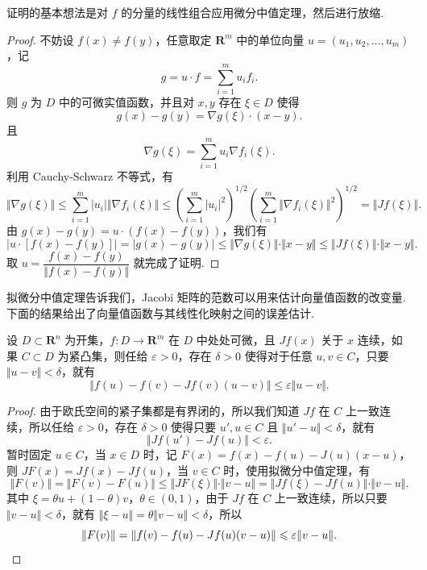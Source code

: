 证明的基本想法是对 $f$ 的分量的线性组合应用微分中值定理，然后进行放缩.

\begin{proof}
    不妨设 $f(x) \neq f(y)$，任意取定 $\mathbf{R}^m$ 中的单位向量 $u = (u_1, u_2, \ldots, u_m)$，记\[g = u\cdot f = \sum_{i = 1}^{m}u_if_i.\]
    则 $g$ 为 $D$ 中的可微实值函数，并且对 $x, y$ 存在 $\xi\in D$ 使得 \[g(x) - g(y) = \nabla g(\xi)\cdot (x - y).\]
    且 \[\nabla g(\xi) = \sum_{i = 1}^{m}u_i\nabla f_i(\xi).\]
    利用 Cauchy-Schwarz 不等式，有 \[\Vert \nabla g(\xi)\Vert \leqslant \sum_{i = 1}^m\vert u_i\vert \Vert \nabla f_i(\xi)\Vert \leqslant \left(\sum_{i = 1}^m\vert u_i\vert^2\right)^{1/2}\left(\sum_{i = 1}^m\Vert \nabla f_i(\xi)\Vert^2\right)^{1/2} = \Vert Jf(\xi)\Vert.\]
    由 $g(x) - g(y) = u\cdot (f(x) - f(y))$，我们有 \[\vert u \cdot [f(x) - f(y)]\vert = \vert g(x) - g(y) \vert \leqslant \Vert \nabla g(\xi)\Vert \cdot \Vert x - y\Vert \leqslant \Vert Jf(\xi)\Vert\cdot \Vert x - y\Vert.\]
    取 $u = \dfrac{f(x) - f(y)}{\Vert f(x) - f(y)\Vert}$ 就完成了证明.
\end{proof}

拟微分中值定理告诉我们，Jacobi 矩阵的范数可以用来估计向量值函数的改变量. 下面的结果给出了向量值函数与其线性化映射之间的误差估计.

\begin{corollary}{}{}
    设 $D\subset \mathbf{R}^n$ 为开集，$f\colon D\to \mathbf{R}^m$ 在 $D$ 中处处可微，且 $Jf(x)$ 关于 $x$ 连续，如果 $C\subset D$ 为紧凸集，则任给 $\varepsilon>0$，存在 $\delta>0$ 使得对于任意 $u, v\in C$，只要 $\Vert u-v\Vert < \delta$，就有\[\Vert f(u) - f(v) - Jf(v)(u-v)\Vert \leqslant \varepsilon\Vert u-v\Vert.\]
\end{corollary}

\begin{proof}
    由于欧氏空间的紧子集都是有界闭的，所以我们知道 $Jf$ 在 $C$ 上一致连续，所以任给 $\varepsilon>0$，存在 $\delta>0$ 使得只要 $u',u\in C$ 且 $\Vert u'-u\Vert < \delta$，就有\[\Vert Jf(u') - Jf(u)\Vert < \varepsilon.\]
    暂时固定 $u\in C$，当 $x\in D$ 时，记 $F(x) = f(x) - f(u) - J(u)(x - u)$，则 $JF(x) = Jf(x) - Jf(u)$，当 $v\in C$ 时，使用拟微分中值定理，有
    \[\Vert F(v)\Vert = \Vert F(v) - F(u)\Vert \leqslant \Vert JF(\xi)\Vert\cdot \Vert v - u\Vert = \Vert Jf(\xi) - Jf(u)\Vert\cdot \Vert v - u\Vert.\]
    其中 $\xi = \theta u + (1-\theta)v$，$\theta\in (0, 1)$，由于 $Jf$ 在 $C$ 上一致连续，所以只要 $\Vert v - u\Vert < \delta$，就有 $\Vert \xi - u\Vert = \theta \Vert v - u\Vert < \delta$，所以\[\Vert F(v)\Vert = \Vert f(v) - f(u) - Jf(u)(v - u)\Vert \leqslant \varepsilon\Vert v - u\Vert. \qedhere\]
\end{proof}

